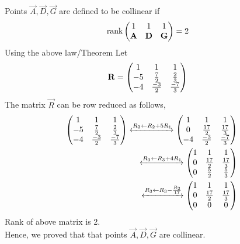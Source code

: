 \documentclass[10pt]{book}
\begin{document}
\begin{enumerate}[label=\thesection.\arabic*.,ref=\thesection.\theenumi]
Points $\vec{A},\vec{D},\vec{G}$ are defined to be collinear if 
\begin{align}
    \text{rank}\begin{pmatrix}
    1 & 1 & 1\\
    \mathbf{A} & \mathbf{D} & \mathbf{G} \\
    \end{pmatrix} &= 2 
\end{align} 
Using the above law/Theorem Let
\begin{align}
    \mathbf{R}&=\begin{pmatrix}
    1 & 1 & 1
    \\
    -5 & \frac{7}{2} & \frac{2}{3}
    \\
    -4  & \frac{-3}{2} & \frac{-7}{3}
    \end{pmatrix} 
\end{align} 
The matrix $\vec{R}$ can be row reduced as follows,
\begin{align}
    \label{eq:mat_row_operations}
    \myvec{
    1 & 1 & 1
    \\
    -5 & \frac{7}{2} & \frac{2}{3}
    \\
    -4  & \frac{-3}{2} & \frac{-7}{3}
    }
     \xleftrightarrow[]{R_2 \leftarrow R_2+5R_1}
    \myvec{
    1 & 1 & 1
    \\
    0 & \frac{17}{2} & \frac{17}{3}
    \\
    -4 & \frac{-3}{2} & \frac{-7}{3} 
    }
    \\
     \xleftrightarrow[]{R_3\leftarrow R_3+4R_1}
    \myvec{
    1 & 1 & 1
    \\
    0 & \frac{17}{2}& \frac{17}{3}
    \\
     0 & \frac{5}{2}& \frac{5}{3}
    }
    \\
     \xleftrightarrow[]{R_3\leftarrow R_3-\frac{R_2}{17}}
    \myvec{
    1 & 1 & 1
    \\
    0 & \frac{17}{2}& \frac{17}{3}
    \\
    0 & 0 & 0
    }
\end{align}
Rank of above matrix is 2.\\
Hence, we proved that that points $\vec{A},\vec{D},\vec{G}$ are collinear.


\end{enumerate}
\end{document}
